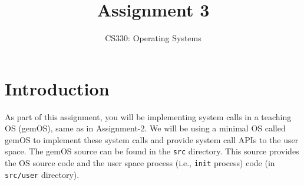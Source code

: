 \documentclass[12pt]{article}
\begin{document}
 
 
\title{Assignment 3}
\author{CS330: Operating Systems}
\date{}

\maketitle

\section{Introduction}

As part of this assignment,
you will be implementing system calls in a teaching OS (gemOS), same as in Assignment-2. 
%
We will be using a minimal OS called gemOS to implement these system calls and provide system call APIs to the user space. 
%
The gemOS source can be found in the {\tt src} directory. This source provides the OS source code and the user space 
process (i.e., {\tt init} process) code (in {\tt src/user} directory).
\end{document}
